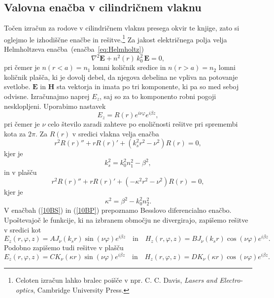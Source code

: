 \subsection*{Valovna enačba v cilindričnem vlaknu}
Točen izračun za rodove v cilindričnem vlaknu presega okvir te knjige, zato
si oglejmo le izhodiščne enačbe in rešitve.\footnote{Celoten izračun lahko bralec 
poišče v npr. C. C. Davis, {\it Lasers and Electro-optics}, Cambridge 
University Press.} Za jakost električnega polja velja 
Helmholtzeva enačba~(enačba~\ref{eq:Helmholtz})
\begin{equation}
\nabla^2 \mathbf{E} + n^2(r)\, k_0^2\, \mathbf{E} = 0,
\end{equation}
pri čemer je $n(r<a)=n_1$ lomni količnik sredice in $n(r>a)=n_2$ 
lomni količnik plašča, ki je dovolj debel, da njegova debelina ne 
vpliva na potovanje svetlobe. $\mathbf{E}$ in $\mathbf{H}$ sta vektorja in imata po 
tri komponente, ki pa so med seboj odvisne. Izračunajmo naprej $E_z$, saj so za to
komponento robni pogoji nesklopljeni. Uporabimo nastavek
\begin{equation}
E_z = R(r)e^{i \nu \varphi}e^{i \beta z},
\end{equation}
pri čemer je $\nu$ celo število zaradi zahteve po enoličnosti rešitve pri spremembi
kota za $2\pi$. Za $R(r)$ v sredici vlakna velja enačba
\begin{equation}
r^2 R(r)'' + r R(r)' + (k_s^2r^2 - \nu^2)R(r) = 0,
\label{10BS}
\end{equation}
kjer je 
\begin{equation}
k_s^2=k_0^2n_1^2- \beta^2,
\label{eq:ks}
\end{equation}
in v plašču
\begin{equation}
r^2 R(r)'' + r R(r)' + (-\kappa^2r^2 - \nu^2)R(r) = 0,
\label{10BP}
\end{equation}
kjer je 
\begin{equation}
\kappa^2=\beta^2-k_0^2n_2^2.
\end{equation}
V enačbah (\ref{10BS}) in (\ref{10BP}) prepoznamo Besslovo diferencialno enačbo. 
Upoštevajoč le funkcije, ki na izbranem območju ne divergirajo, zapišemo rešitve v sredici kot
\begin{equation}
E_z (r, \varphi, z) = A J_\nu(k_sr)\sin(\nu \varphi)e^{i \beta z} \quad  \mathrm{in} \quad 
H_z (r, \varphi, z) = B J_\nu(k_sr)\cos(\nu \varphi)e^{i \beta z}.
\end{equation}
Podobno zapišemo tudi rešitve v plašču
\begin{equation}
E_z (r, \varphi, z)= C K_\nu(\kappa r)\sin(\nu \varphi)e^{i \beta z} \quad \mathrm{in} \quad 
H_z (r, \varphi, z)= D K_\nu(\kappa r)\cos(\nu \varphi)e^{i \beta z}.
\end{equation}
